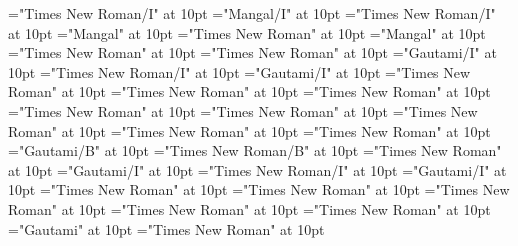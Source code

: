 \documentclass[a4paper]{article}
\begin{document}
\font\spanengrammaticalinfosensesentryletDatadicBody="Times New Roman/I" at 10pt
\font\partofspeechLehigrammaticalinfosensesentryletDatadicBody="Mangal/I" at 10pt
\font\spanenpartofspeechLehigrammaticalinfosensesentryletDatadicBody="Times New Roman/I" at 10pt
\font{}="Mangal" at 10pt
\font\spanendefinitionLehisensesentryletDatadicBody="Times New Roman" at 10pt
\font\spanhidefinitionLehisensesentryletDatadicBody="Mangal" at 10pt
\font\examplessensesentryletDatadicBody="Times New Roman" at 10pt
\font\spanenexamplessensesentryletDatadicBody="Times New Roman" at 10pt
\font\exampleggoTeluINexamplessensesentryletDatadicBody="Gautami/I" at 10pt
\font\spanenexampleggoTeluINexamplessensesentryletDatadicBody="Times New Roman/I" at 10pt
\font\spanggoTeluINexampleggoTeluINexamplessensesentryletDatadicBody="Gautami/I" at 10pt
\font\primaryrefssensesentryletDatadicBody="Times New Roman" at 10pt
\font\spanenprimaryrefssensesentryletDatadicBody="Times New Roman" at 10pt
\font\complexformprimaryrefssensesentryletDatadicBody="Times New Roman" at 10pt
\font\complexformentrytypecomplexformprimaryrefssensesentryletDatadicBody="Times New Roman" at 10pt
\font\LexEntryTypepublishAbbreviationForReversalAbbreviationPubencomplexformentrytypecomplexformprimaryrefssensesentryletDatadicBody="Times New Roman" at 10pt
\font\spanenLexEntryTypepublishAbbreviationForReversalAbbreviationPubencomplexformentrytypecomplexformprimaryrefssensesentryletDatadicBody="Times New Roman" at 10pt
\font\complexformcomponentscomplexformprimaryrefssensesentryletDatadicBody="Times New Roman" at 10pt
\font\acomplexformcomponentscomplexformprimaryrefssensesentryletDatadicBody="Times New Roman" at 10pt
\font\mainentryrefggoTeluINacomplexformcomponentscomplexformprimaryrefssensesentryletDatadicBody="Gautami/B" at 10pt
\font\spanenmainentryrefggoTeluINacomplexformcomponentscomplexformprimaryrefssensesentryletDatadicBody="Times New Roman/B" at 10pt
\font\xitemexamplessensesentryletDatadicBody="Times New Roman" at 10pt
\font\exampleggoTeluINxitemexamplessensesentryletDatadicBody="Gautami/I" at 10pt
\font\spanenexampleggoTeluINxitemexamplessensesentryletDatadicBody="Times New Roman/I" at 10pt
\font\spanggoTeluINexampleggoTeluINxitemexamplessensesentryletDatadicBody="Gautami/I" at 10pt
\font\complexformrefssensesentryletDatadicBody="Times New Roman" at 10pt
\font\spanencomplexformrefssensesentryletDatadicBody="Times New Roman" at 10pt
\font\complexformrefcomplexformrefssensesentryletDatadicBody="Times New Roman" at 10pt
\font\complexformrefentrytypecomplexformrefcomplexformrefssensesentryletDatadicBody="Times New Roman" at 10pt
\font\spanencomplexformrefentrytypecomplexformrefcomplexformrefssensesentryletDatadicBody="Times New Roman" at 10pt
\font\complexformrefheadwordggoTeluINcomplexformrefcomplexformrefssensesentryletDatadicBody="Gautami" at 10pt
\font\spanencomplexformrefheadwordggoTeluINcomplexformrefcomplexformrefssensesentryletDatadicBody="Times New Roman" at 10pt
\end{document}
